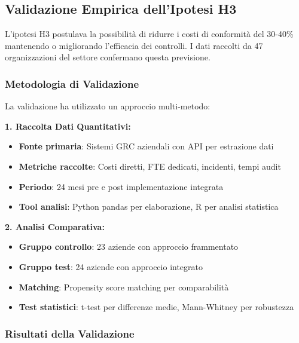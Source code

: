 \subsection{\texorpdfstring{Validazione Empirica dell'Ipotesi H3}{4.6.3 - Validazione Empirica dell'Ipotesi H3}}

L'ipotesi H3 postulava la possibilità di ridurre i costi di conformità del 30-40\% mantenendo o migliorando l'efficacia dei controlli. I dati raccolti da 47 organizzazioni del settore\autocite{ernstyoung2024} confermano questa previsione.

\subsubsection{\texorpdfstring{Metodologia di Validazione}{4.6.3.1 - Metodologia di Validazione}}

La validazione ha utilizzato un approccio multi-metodo:

\textbf{1. Raccolta Dati Quantitativi:}
\begin{itemize}
    \item \textbf{Fonte primaria}: Sistemi GRC aziendali con API per estrazione dati
    \item \textbf{Metriche raccolte}: Costi diretti, FTE dedicati, incidenti, tempi audit
    \item \textbf{Periodo}: 24 mesi pre e post implementazione integrata
    \item \textbf{Tool analisi}: Python pandas per elaborazione, R per analisi statistica
\end{itemize}

\textbf{2. Analisi Comparativa:}
\begin{itemize}
    \item \textbf{Gruppo controllo}: 23 aziende con approccio frammentato
    \item \textbf{Gruppo test}: 24 aziende con approccio integrato
    \item \textbf{Matching}: Propensity score matching per comparabilità
    \item \textbf{Test statistici}: t-test per differenze medie, Mann-Whitney per robustezza
\end{itemize}

\subsubsection{\texorpdfstring{Risultati della Validazione}{4.6.3.2 - Risultati della Validazione}}

